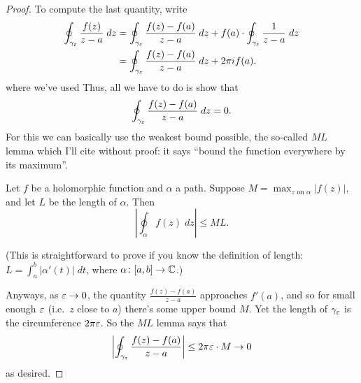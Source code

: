 \begin{proof}
	To compute the last quantity, write
	\begin{align*}
		\oint_{\gamma_\varepsilon} \frac{f(z)}{z-a} \; dz
		&=
		\oint_{\gamma_\varepsilon} \frac{f(z)-f(a)}{z-a} \; dz
		+
		f(a) \cdot \oint_{\gamma_\varepsilon} \frac{1}{z-a} \; dz \\
		&=
		\oint_{\gamma_\varepsilon} \frac{f(z)-f(a)}{z-a} \; dz
		+
		2\pi i f(a).
	\end{align*}
	where we've used 
	Thus, all we have to do is show that
	\[ \oint_{\gamma_\varepsilon} \frac{f(z)-f(a)}{z-a} \; dz = 0. \]
	For this we can basically use the weakest bound possible, the so-called $ML$ lemma
	which I'll cite without proof:
	it says ``bound the function everywhere by its maximum''.
	\begin{lemma}
		Let $f$ be a holomorphic function and $\alpha$ a path.
		Suppose $M = \max_{z \text{ on } \alpha} \left\lvert f(z) \right\rvert$, and
		let $L$ be the length of $\alpha$.
		Then
		\[ \left\lvert \oint_\alpha f(z) \; dz \right\rvert \le ML. \]
	\end{lemma}
	(This is straightforward to prove if you know the definition of length:
	$L = \int_a^b |\alpha'(t)| \; dt$, where $\alpha \colon [a,b] \to \mathbb C$.)

	Anyways, as $\varepsilon \to 0$, the quantity $\frac{f(z)-f(a)}{z-a}$ approaches $f'(a)$,
	and so for small enough $\varepsilon$ (i.e.\ $z$ close to $a$) there's some upper bound $M$.
	Yet the length of $\gamma_\varepsilon$ is the circumference $2\pi \varepsilon$.
	So the $ML$ lemma says that
	\[ \left\lvert \oint_{\gamma_\varepsilon} \frac{f(z)-f(a)}{z-a} \right\rvert
		\le 2\pi\varepsilon \cdot M \to 0
	\]
	as desired.
\end{proof}

